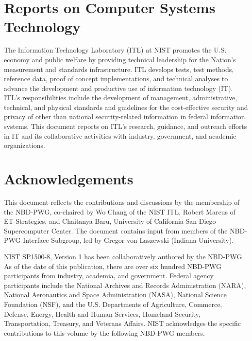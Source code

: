 \newpage

\section*{\hfill Reports on Computer Systems Technology \hfill}

The Information Technology Laboratory (ITL) at NIST promotes the U.S. economy and public welfare by 
providing technical leadership for the Nation’s measurement and standards infrastructure. ITL develops 
tests, test methods, reference data, proof of concept implementations, and technical analyses to advance 
the development and productive use of information technology (IT). ITL’s responsibilities include the 
development of management, administrative, technical, and physical standards and guidelines for the 
cost-effective security and privacy of other than national security-related information in federal 
information systems. This document reports on ITL’s research, guidance, and outreach efforts in IT and 
its collaborative activities with industry, government, and academic organizations.


\section*{\hfill Acknowledgements \hfill}

This document reflects the contributions and discussions by the
membership of the NBD-PWG, co-chaired by Wo Chang of the NIST ITL,
Robert Marcus of ET-Strategies, and Chaitanya Baru, University of
California San Diego Supercomputer Center.  The document contains
input from members of the NBD-PWG Interface Subgroup, led by Gregor
von Laszewski (Indiana University).

NIST SP1500-8, Version 1 has been collaboratively authored by the
NBD-PWG.  As of the date of this publication, there are over six
hundred NBD-PWG participants from industry, academia, and government.
Federal agency participants include the National Archives and Records
Administration (NARA), National Aeronautics and Space Administration
(NASA), National Science Foundation (NSF), and the U.S.  Departments
of Agriculture, Commerce, Defense, Energy, Health and Human Services,
Homeland Security, Transportation, Treasury, and Veterans
Affairs. NIST acknowledges the specific contributions to this volume
by the following NBD-PWG members.

